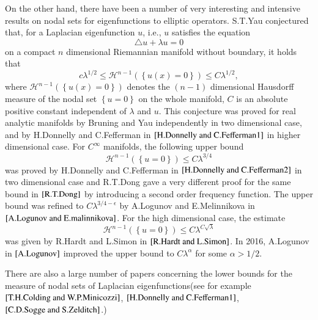 \documentclass[a4paper, 12pt, onecolumn]{article} \textwidth 148mm
\begin{document}
On the other hand, there have been a number of very interesting and intensive results on nodal sets for eigenfunctions to elliptic operators. S.T.Yau conjectured that, for a Laplacian eigenfunction $u$, i.e., $u$ satisfies the equation $$\triangle u+\lambda u=0$$ on a compact $n$ dimensional Riemannian manifold without boundary, it holds that
\begin{equation}\label{1.4}
c\lambda^{1/2}\leq\mathcal{H}^{n-1}\left(\left\{u(x)=0\right\}\right)\leq C\lambda^{1/2},
\end{equation}
where $\mathcal{H}^{n-1}\left(\left\{u(x)=0\right\}\right)$ denotes the $(n-1)$ dimensional Hausdorff measure of the nodal set $\left\{u=0\right\}$ on the whole manifold, $C$ is an absolute positive constant independent of $\lambda$ and $u$. This conjecture was proved for real analytic manifolds by Bruning and Yau independently in two dimensional case, and by H.Donnelly and C.Fefferman in $\cite{H.Donnelly and C.Fefferman1}$ in higher dimensional case. For $C^{\infty}$ manifolds, the following upper bound
\begin{equation}\label{1.5}
\mathcal{H}^{n-1}\left(\left\{u=0\right\}\right)\leq C\lambda^{3/4}
\end{equation}
was proved by H.Donnelly and C.Fefferman in $\cite{H.Donnelly and C.Fefferman2}$ in two dimensional case and R.T.Dong gave a very different proof for the same bound in $\cite{R.T.Dong}$ by introducing a second order frequency function. The upper bound was refined to $C\lambda^{3/4-\epsilon}$ by A.Logunov and E.Melinnikova in $\cite{A.Logunov and E.malinnikova}$. For the high dimensional case, the estimate
\begin{equation}\label{1.6}
\mathcal{H}^{n-1}\left(\left\{u=0\right\}\right)\leq C\lambda^{C\sqrt{\lambda}}
\end{equation}
was given by R.Hardt and L.Simon in $\cite{R.Hardt and L.Simon}$. In 2016, A.Logunov in $\cite{A.Logunov}$ improved the upper bound to $C\lambda^{\alpha}$ for some $\alpha>1/2$.

There are also a large number of papers concerning the lower bounds for the measure of nodal sets of Laplacian eigenfunctions(see for example $\cite{T.H.Colding and W.P.Minicozzi}$, $\cite{H.Donnelly and C.Fefferman1}$, $
\cite{C.D.Sogge and S.Zelditch}$.)
\end{document}

